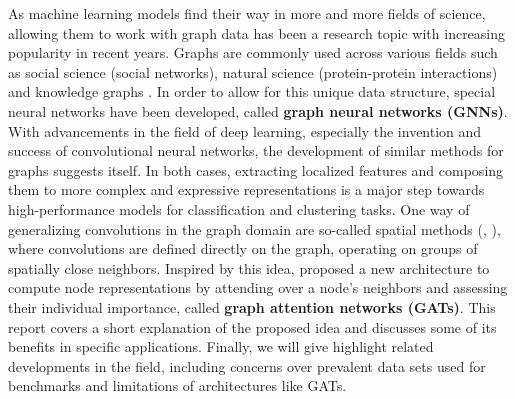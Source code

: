 \label{chapter:introduction}

As machine learning models find their way in more and more fields of science, allowing them to work with graph data has been a research topic with increasing popularity in recent years. Graphs are commonly used across various fields such as social science (social networks), natural science (protein-protein interactions) and knowledge graphs \cite{zhou2021graph}. In order to allow for this unique data structure, special neural networks have been developed, called \textbf{graph neural networks (GNNs)}. With advancements in the field of deep learning, especially the invention and success of convolutional neural networks, the development of similar methods for graphs suggests itself. In both cases, extracting localized features and composing them to more complex and expressive representations is a major step towards high-performance models for classification and clustering tasks. One way of generalizing convolutions in the graph domain are so-called spatial methods (\cite{hamilton2018inductive}, \cite{monti2016geometric}), where convolutions are defined directly on the graph, operating on groups of spatially close neighbors. Inspired by this idea, \cite{velickovic2018graph} proposed a new architecture to compute node representations by attending over a node's neighbors and assessing their individual importance, called \textbf{graph attention networks (GATs)}. This report covers a short explanation of the proposed idea and discusses some of its benefits in specific applications. Finally, we will give highlight related developments in the field, including concerns over prevalent data sets used for benchmarks and limitations of architectures like GATs.
\\~\\
